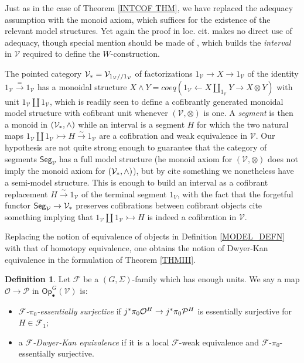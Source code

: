 \documentclass[a4paper,10pt
,draft
]{article}%
\numberwithin{equation}{section}
\numberwithin{figure}{section}
\theoremstyle{definition} %
\newtheorem{definition}[equation]{Definition}%
\newcommand{\Op}{\mathsf{Op}}%
\newcommand{\F}{\ensuremath{\mathcal F}}
\newcommand{\V}{\ensuremath{\mathcal V}}
\renewcommand{\O}{\ensuremath{\mathcal O}}
\renewcommand{\P}{\ensuremath{\mathcal P}}
\newcommand{\1}{\ensuremath{\mathbbm 1}}%
\begin{document}
Just as in the case of Theorem \ref{INTCOF THM},
we have replaced the adequacy assumption \cite[Defn 1.1]{BM13}
with the monoid axiom, which suffices for the existence of the relevant model structures. 
Yet again the proof in loc. cit. makes no direct use of adequacy, 
though special mention should be made of \cite[Lemma 2.23]{BM13}, 
which builds the \emph{interval} \cite[Defn. 4.1]{BM06} in $\V$
required to define the $W$-construction.

The pointed category $\V_{\**}=\V_{1_{\V}//1_{\V}}$
of factorizations
$1_{\V} \to X \to 1_{\V}$
of the identity
$1_{\V} \xrightarrow{=} 1_{\V}$
has a monoidal structure
$X \wedge Y  = coeq \left(1_{\V} \leftarrow X \amalg_{1_{\V}} Y \to X \otimes Y\right)$ with unit $1_{\V} \amalg 1_{\V}$,
which is readily seen to define a cofibrantly generated monoidal model structure with cofibrant unit whenever $(\V,\otimes)$ is one.
A \emph{segment} \cite[Defn 4.1]{BM06} is then a monoid
in $(\V_{\**},\wedge)$
while an interval is a segment $H$ for which the two natural maps
$1_{\V} \amalg 1_{\V} \rightarrowtail H \xrightarrow{\sim} 1_{\V}$
are a cofibration and weak equivalence in $\V$.
Our hypothesis are not quite strong enough 
to guarantee that the category of segments $\mathsf{Seg}_{\V}$
has a full model structure 
(he monoid axiom for $(\V,\otimes)$ does not imply the monoid axiom for $(\V_{\**},\wedge)$),
but by {\color{red} cite something}
we nonetheless have a semi-model structure. This is enough to build an interval as a cofibrant replacement
$H \xrightarrow{\sim} 1_{\V}$
of the terminal segment $1_{V}$, with the fact that the forgetful functor
$\mathsf{Seg}_{\V} \to \V_{\**}$
preserves cofibrations between cofibrant objects 
{\color{red} cite something}
implying that
$1_{\V} \amalg 1_{\V} \rightarrowtail H$
is indeed a cofibration in $\V$.


\vskip 10pt



Replacing the notion of equivalence of objects
in Definition \ref{MODEL_DEFN}
with that of homotopy equivalence, 
one obtains the notion of Dwyer-Kan equivalence
in the formulation of Theorem \ref{THMIII}.


\begin{definition}\label{DKEQUIV_DEF}
Let $\F$ be a $(G,\Sigma)$-family which has enough units.
We say a map $\O \to \P$ in $\Op^G_\bullet(\V)$ is:
\begin{itemize}
\item \textit{$\F$-$\pi_0$-essentially surjective} if
	$j^{\**}\pi_0 \O^H \to j^{\**}\pi_0 \P^H$
	is essentially surjective for $H \in \F_1$;
\item a \textit{$\F$-Dwyer-Kan equivalence} if
	it is a local $\F$-weak equivalence and $\F$-$\pi_0$-essentially
	surjective.
\end{itemize}
\end{definition}
\end{document}

